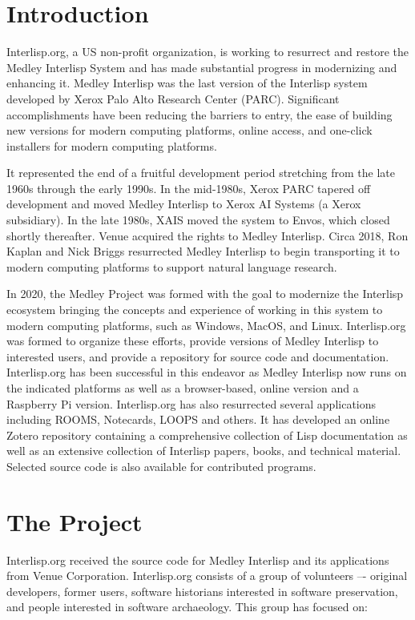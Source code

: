 \documentclass[sigconf]{acmart}
\begin{document}
\section{Introduction}
Interlisp.org, a US non-profit organization, is working to resurrect and restore the Medley Interlisp System and has made substantial progress in modernizing and enhancing it. Medley Interlisp was the last version of the Interlisp system developed by Xerox Palo Alto Research Center (PARC). Significant accomplishments have been reducing the barriers to entry, the ease of building new versions for modern computing platforms, online access, and one-click installers for modern computing platforms.

It represented the end of a fruitful development period stretching from the late 1960s through the early 1990s. In the mid-1980s, Xerox PARC tapered off development and moved Medley Interlisp to Xerox AI Systems (a Xerox subsidiary). In the late 1980s, XAIS moved the system to Envos, which closed shortly thereafter. Venue acquired the rights to Medley Interlisp. Circa 2018, Ron Kaplan and Nick Briggs resurrected Medley Interlisp to begin transporting it to modern computing platforms to support natural language research.

In 2020, the Medley Project was formed with the goal to modernize the Interlisp ecosystem bringing the concepts and experience of working in this system to modern computing platforms, such as Windows, MacOS, and Linux. Interlisp.org was formed to organize these efforts, provide versions of Medley Interlisp to interested users, and provide a repository for source code and documentation. Interlisp.org has been successful in this endeavor as Medley Interlisp now runs on the indicated platforms as well as a browser-based, online version and a Raspberry Pi version. Interlisp.org has also resurrected several applications including ROOMS, Notecards, LOOPS and others. It has developed an online Zotero repository containing a comprehensive collection of Lisp documentation as well as an extensive collection of Interlisp papers, books, and technical material. Selected source code is also available for contributed programs.

\section{The Project}

Interlisp.org received the source code for Medley Interlisp and its applications from Venue Corporation. Interlisp.org consists of a group of volunteers –- original developers, former users, software historians interested in software preservation, and people interested in software archaeology. This group has focused on:
\end{document}
